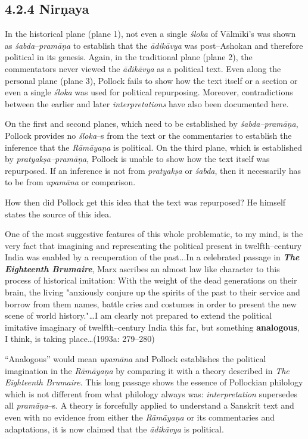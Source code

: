 \subsection*{4.2.4 Nirṇaya}

In the historical plane (plane 1), not even a single \textit{śloka} of Vālmīki’s was shown as \textit{śabda}–\textit{pramāṇa }to establish that the \textit{ādikāvya }was post–Ashokan and therefore political in its genesis. Again, in the traditional plane (plane 2), the commentators never viewed the \textit{ādikāvya} as a political text. Even along the personal plane (plane 3), Pollock fails to show how the text itself or a section or even a single \textit{śloka} was used for political repurposing. Moreover, contradictions between the earlier and later \textit{interpretations} have also been documented here.

On the first and second planes, which need to be established by \textit{śabda–pramāṇa}, Pollock provides no \textit{śloka}–s from the text or the commentaries to establish the inference that the\textit{ Rāmāyaṇa }is political. On the third plane, which is established by \textit{pratyakṣa–pramāṇa}, Pollock is unable to show how the text itself was repurposed. If an inference is not from \textit{pratyakṣa }or \textit{śabda}, then it necessarily has to be from \textit{upamāna }or comparison.

How then did Pollock get this idea that the text was repurposed? He himself states the source of this idea.

\begin{myquote}
One of the most suggestive features of this whole problematic, to my mind, is the very fact that imagining and representing the political present in twelfth–century India was enabled by a recuperation of the past...In a celebrated passage in \textit{\textbf{The Eighteenth Brumaire}}, Marx ascribes an almost law like character to this process of historical imitation: With the weight of the dead generations on their brain, the living "anxiously conjure up the spirits of the past to their service and borrow from them names, battle cries and costumes in order to present the new scene of world history."…I am clearly not prepared to extend the political imitative imaginary of twelfth–century India this far, but something \textbf{analogous}, I think, is taking place…(1993a: 279–280)
\end{myquote}

“Analogous” would mean \textit{upamāna }and Pollock establishes the political imagination in the \textit{Rāmāyaṇa }by comparing it with a theory described in \textit{The Eighteenth Brumaire}. This long passage shows the essence of Pollockian philology which is not different from what philology always was: \textit{interpretation} supersedes all \textit{pramāṇa}–s. A theory is forcefully applied to understand a Sanskrit text and even with no evidence from either the \textit{Rāmāyaṇa} or its commentaries and adaptations, it is now claimed that the \textit{ādikāvya }is political.

